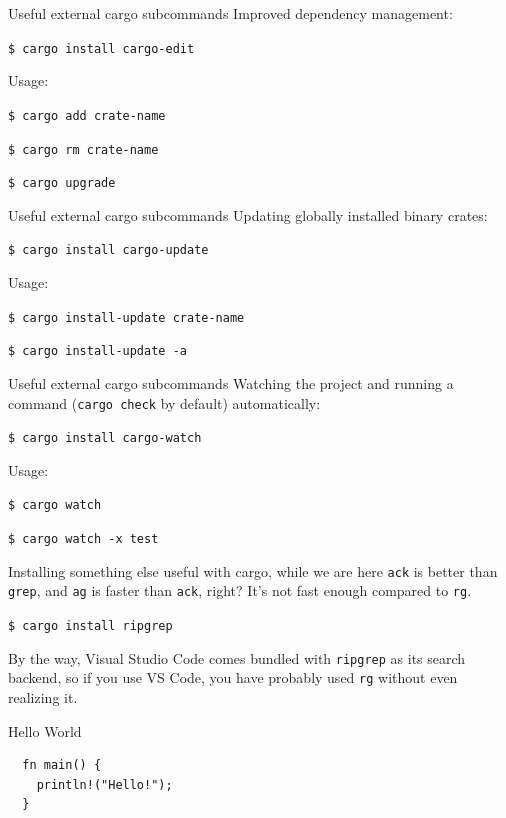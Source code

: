 \documentclass[12pt, aspectratio=169]{beamer}
\begin{document}
\begin{frame}{Useful external cargo subcommands}
  Improved dependency management:

  \texttt{\$ cargo install cargo-edit}

  Usage:

  \texttt{\$ cargo add crate-name}

  \texttt{\$ cargo rm crate-name}

  \texttt{\$ cargo upgrade}
\end{frame}

\begin{frame}{Useful external cargo subcommands}
  Updating globally installed binary crates:

  \texttt{\$ cargo install cargo-update}

  Usage:

  \texttt{\$ cargo install-update crate-name}

  \texttt{\$ cargo install-update -a}
\end{frame}

\begin{frame}{Useful external cargo subcommands}
  Watching the project and running a command (\texttt{cargo check} by default)
  automatically:

  \texttt{\$ cargo install cargo-watch}

  Usage:

  \texttt{\$ cargo watch}

  \texttt{\$ cargo watch -x test}
\end{frame}

\begin{frame}{Installing something else useful with cargo, while we are here}
  \texttt{ack} is better than \texttt{grep}, and \texttt{ag} is faster than
  \texttt{ack}, right? It's not fast enough compared to \texttt{rg}.

  \texttt{\$ cargo install ripgrep}

  By the way, Visual Studio Code comes bundled with \texttt{ripgrep} as its
  search backend, so if you use VS Code, you have probably used \texttt{rg}
  without even realizing it.
\end{frame}

\begin{frame}[fragile]{Hello World}
  \begin{verbatim}
  fn main() {
    println!("Hello!");
  }
  \end{verbatim}
\end{frame}
\end{document}
